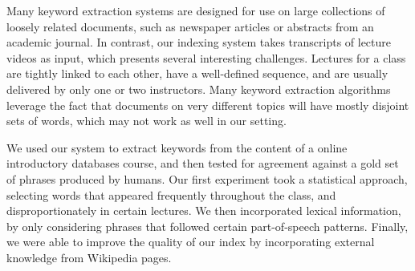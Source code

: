 Many keyword extraction systems are designed for use on large collections of loosely related documents, such as newspaper articles or abstracts from an academic journal. In contrast, our indexing system takes transcripts of lecture videos as input, which presents several interesting challenges. Lectures for a class are tightly linked to each other, have a well-defined sequence, and are usually delivered by only one or two instructors. Many keyword extraction algorithms leverage the fact that documents on very different topics will have mostly disjoint sets of words, which may not work as well in our setting.

We used our system to extract keywords from the content of a online introductory databases course, and then tested for agreement against a gold set of phrases produced by humans. Our first experiment took a statistical approach, selecting words that appeared frequently throughout the class, and disproportionately in certain lectures. We then incorporated lexical information, by only considering phrases that followed certain part-of-speech patterns. Finally, we were able to improve the quality of our index by incorporating external knowledge from Wikipedia pages.
